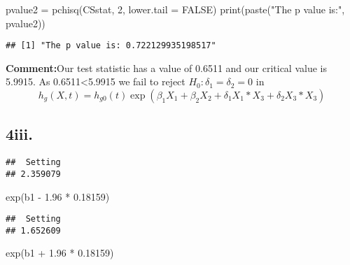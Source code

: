 \documentclass[
]{article}
\newenvironment{Shaded}{\begin{snugshade}}{\end{snugshade}}
\newcommand{\AttributeTok}[1]{\textcolor[rgb]{0.77,0.63,0.00}{#1}}
\newcommand{\CommentTok}[1]{\textcolor[rgb]{0.56,0.35,0.01}{\textit{#1}}}
\newcommand{\ConstantTok}[1]{\textcolor[rgb]{0.00,0.00,0.00}{#1}}
\newcommand{\DecValTok}[1]{\textcolor[rgb]{0.00,0.00,0.81}{#1}}
\newcommand{\FloatTok}[1]{\textcolor[rgb]{0.00,0.00,0.81}{#1}}
\newcommand{\FunctionTok}[1]{\textcolor[rgb]{0.00,0.00,0.00}{#1}}
\newcommand{\NormalTok}[1]{#1}
\newcommand{\OtherTok}[1]{\textcolor[rgb]{0.56,0.35,0.01}{#1}}
\newcommand{\SpecialCharTok}[1]{\textcolor[rgb]{0.00,0.00,0.00}{#1}}
\newcommand{\StringTok}[1]{\textcolor[rgb]{0.31,0.60,0.02}{#1}}
\begin{document}
\begin{Shaded}
\begin{Highlighting}[]
\NormalTok{pvalue2 }\OtherTok{=} \FunctionTok{pchisq}\NormalTok{(CSstat, }\DecValTok{2}\NormalTok{, }\AttributeTok{lower.tail =} \ConstantTok{FALSE}\NormalTok{)}
\FunctionTok{print}\NormalTok{(}\FunctionTok{paste}\NormalTok{(}\StringTok{"The p value is:"}\NormalTok{, pvalue2))}
\end{Highlighting}
\end{Shaded}

\begin{verbatim}
## [1] "The p value is: 0.722129935198517"
\end{verbatim}

\textbf{Comment:}Our test statistic has a value of 0.6511 and our
critical value is 5.9915. As 0.6511\textless5.9915 we fail to reject
\(H_0: \delta_1=\delta_2=0\) in \[
h_g(X,t)=h_{g0}(t)\exp(\beta_1 X_1+ \beta_2 X_2 + \delta_1 X_1*X_3 + \delta_2 X_3*X_3)
\]

\hypertarget{iii.}{%
\subsection{4iii.}\label{iii.}}

\begin{Shaded}
\end{Shaded}

\begin{verbatim}
##  Setting 
## 2.359079
\end{verbatim}

\begin{Shaded}
\begin{Highlighting}[]
\FunctionTok{exp}\NormalTok{(b1 }\SpecialCharTok{{-}} \FloatTok{1.96} \SpecialCharTok{*} \FloatTok{0.18159}\NormalTok{)}
\end{Highlighting}
\end{Shaded}

\begin{verbatim}
##  Setting 
## 1.652609
\end{verbatim}

\begin{Shaded}
\begin{Highlighting}[]
\FunctionTok{exp}\NormalTok{(b1 }\SpecialCharTok{+} \FloatTok{1.96} \SpecialCharTok{*} \FloatTok{0.18159}\NormalTok{)}
\end{Highlighting}
\end{Shaded}
\end{document}
